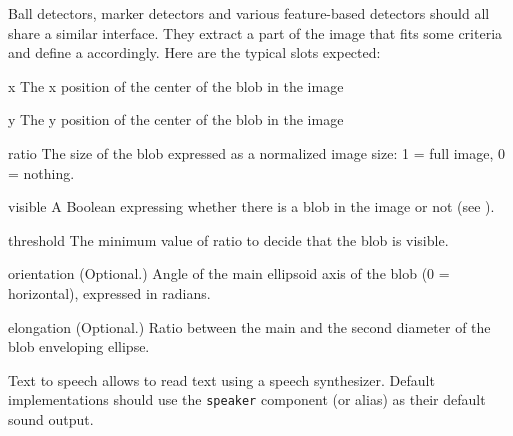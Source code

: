 
Ball detectors, marker detectors and various feature-based detectors
should all share a similar interface. They extract a part of the image
that fits some criteria and define a  accordingly. Here are
the typical slots expected:

\begin{urbiscriptapi}
\item[x] The x position of the center of the blob in the image

\item[y] The y position of the center of the blob in the image

\item[ratio] The size of the blob expressed as a normalized image size: 1 =
  full image, 0 = nothing.

\item[visible] A Boolean expressing whether there is a blob in the image or
  not (see ).

\item[threshold] The minimum value of ratio to decide that the blob is
  visible.

\item[orientation] (Optional.)  Angle of the main ellipsoid axis of the blob
  (0 = horizontal), expressed in radians.

\item[elongation] (Optional.)  Ratio between the main and the second
  diameter of the blob enveloping ellipse.
\end{urbiscriptapi}

Text to speech allows to read text using a speech synthesizer. Default
implementations should use the \lstinline{speaker} component (or alias) as
their default sound output.

